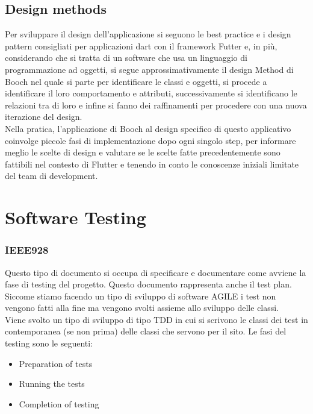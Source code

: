 \documentclass{article}
\begin{document}
\subsection{Design methods}
Per sviluppare il design dell’applicazione si seguono le best practice e i design pattern consigliati per applicazioni dart con il framework Futter e, in più, considerando che si tratta di un software che usa un linguaggio di programmazione ad oggetti, si segue approssimativamente il design Method di Booch nel quale si parte per identificare le classi e oggetti, si procede a identificare il loro comportamento e attributi, successivamente si identificano le relazioni tra di loro e infine si fanno dei raffinamenti per procedere con una nuova iterazione del design. 
\\Nella pratica, l’applicazione di Booch al design specifico di questo applicativo coinvolge piccole fasi di implementazione dopo ogni singolo step, per informare meglio le scelte di design e valutare se le scelte fatte precedentemente sono fattibili nel contesto di Flutter e tenendo in conto le conoscenze iniziali limitate del team di development. 


\newpage
\section{Software Testing}
\subsubsection{IEEE928}
Questo tipo di documento si occupa di specificare e documentare come avviene la fase di testing
del progetto. Questo documento rappresenta anche il test plan. Siccome stiamo facendo un tipo di
sviluppo di software AGILE i test non vengono fatti alla fine ma vengono svolti assieme allo
sviluppo delle classi.
\\Viene svolto un tipo di sviluppo di tipo TDD in cui si scrivono le classi dei test in 
contemporanea (se non prima) delle classi che servono per il sito. Le fasi del testing sono le 
seguenti:
\begin{itemize}
    \item Preparation of tests 
    \item Running the  tests
    \item Completion of testing
\end{itemize} 
\end{document}
